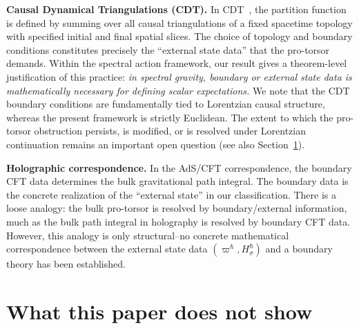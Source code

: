 \documentclass[12pt,a4paper]{article}
\theoremstyle{plain}
\theoremstyle{definition}
\theoremstyle{remark}
\begin{document}
\noindent\textbf{Causal Dynamical Triangulations (CDT).}\quad
In CDT~\cite{AJL:2005,AJL:2012}, the partition function is defined
by summing over all causal triangulations of a fixed spacetime topology
with specified initial and final spatial slices.  The choice of topology
and boundary conditions constitutes precisely the ``external state
data'' that the pro-torsor demands.  Within the spectral action framework, our result gives a theorem-level
justification of this practice: \emph{in spectral gravity, boundary
or external state data is mathematically necessary for defining
scalar expectations.}
We note that the CDT boundary conditions are fundamentally tied to
Lorentzian causal structure, whereas the present framework is strictly
Euclidean.  The extent to which the pro-torsor obstruction persists, is
modified, or is resolved under Lorentzian continuation remains an
important open question (see also Section~\ref{sec:not-shown}).

\medskip

\noindent\textbf{Holographic correspondence.}\quad
In the AdS/CFT correspondence, the boundary CFT data determines the
bulk gravitational path integral.  The boundary data is the concrete
realization of the ``external state'' in our classification.  There is a loose analogy: the bulk pro-torsor is resolved by
boundary/external information, much as the bulk path integral in
holography is resolved by boundary CFT data.  However, this analogy
is only structural--no concrete mathematical correspondence between
the external state data $({\varpi}^\hbar, H_\sigma^\hbar)$ and
a boundary theory has been established.


\section{What this paper does not show}
\label{sec:not-shown}
\end{document}
